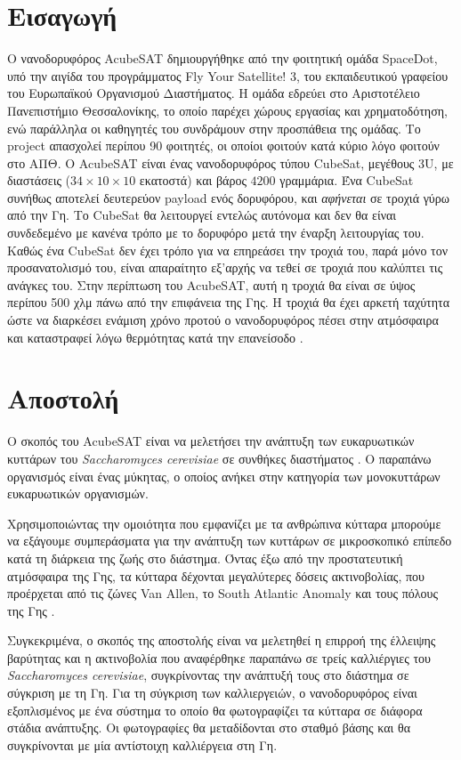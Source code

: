 \documentclass[a4paper,nobib,justified]{tufte-book}
\begin{document}
\section{Εισαγωγή}
Ο νανοδορυφόρος AcubeSAT δημιουργήθηκε από την φοιτητική ομάδα SpaceDot, υπό την αιγίδα του προγράμματος Fly Your Satellite! 3, του εκπαιδευτικού γραφείου του Ευρωπαϊκού Οργανισμού Διαστήματος. Η ομάδα εδρεύει στο Αριστοτέλειο Πανεπιστήμιο Θεσσαλονίκης, το οποίο παρέχει χώρους εργασίας και χρηματοδότηση, ενώ παράλληλα οι καθηγητές του συνδράμουν στην προσπάθεια της ομάδας. Το project απασχολεί περίπου 90 φοιτητές, οι οποίοι φοιτούν κατά κύριο λόγο φοιτούν στο ΑΠΘ. Ο AcubeSAT είναι ένας νανοδορυφόρος τύπου CubeSat, μεγέθους 3U, με διαστάσεις ($34 \times 10 \times 10$ εκατοστά) και βάρος $4200$ γραμμάρια. Ένα CubeSat συνήθως αποτελεί δευτερεύον payload ενός δορυφόρου, και \emph{αφήνεται} σε τροχιά γύρω από την Γη. Το CubeSat θα λειτουργεί εντελώς αυτόνομα και δεν θα είναι συνδεδεμένο με κανένα τρόπο με το δορυφόρο μετά την έναρξη λειτουργίας του. Καθώς ένα CubeSat δεν έχει τρόπο για να επηρεάσει την τροχιά του, παρά μόνο τον προσανατολισμό του, είναι απαραίτητο εξ'αρχής να τεθεί σε τροχιά που καλύπτει τις ανάγκες του. Στην περίπτωση του AcubeSAT, αυτή η τροχιά θα είναι σε ύψος περίπου 500 χλμ πάνω από την επιφάνεια της Γης. Η τροχιά θα έχει αρκετή ταχύτητα ώστε να διαρκέσει ενάμιση χρόνο προτού ο νανοδορυφόρος πέσει στην ατμόσφαιρα και καταστραφεί λόγω θερμότητας κατά την επανείσοδο .

\section{Αποστολή}
Ο σκοπός του AcubeSAT είναι να μελετήσει την ανάπτυξη των ευκαρυωτικών κυττάρων του \emph{Saccharomyces cerevisiae} σε συνθήκες διαστήματος . Ο παραπάνω οργανισμός είναι ένας μύκητας, ο οποίος ανήκει στην κατηγορία των μονοκυττάρων ευκαρυωτικών οργανισμών. 

Χρησιμοποιώντας την ομοιότητα που εμφανίζει με τα ανθρώπινα κύτταρα μπορούμε να εξάγουμε συμπεράσματα για την ανάπτυξη των κυττάρων σε μικροσκοπικό επίπεδο κατά τη διάρκεια της ζωής στο διάστημα. Όντας έξω από την προστατευτική ατμόσφαιρα της Γης, τα κύτταρα δέχονται μεγαλύτερες δόσεις ακτινοβολίας, που προέρχεται από τις ζώνες Van Allen, το South Atlantic Anomaly και τους πόλους της Γης . 

Συγκεκριμένα, ο σκοπός της αποστολής είναι να μελετηθεί η επιρροή της έλλειψης βαρύτητας και η ακτινοβολία που αναφέρθηκε παραπάνω σε τρείς καλλιέργιες του \emph{Saccharomyces cerevisiae}, συγκρίνοντας την ανάπτυξή τους στο διάστημα σε σύγκριση με τη Γη. Για τη σύγκριση των καλλιεργειών, ο νανοδορυφόρος είναι εξοπλισμένος με ένα σύστημα το οποίο θα φωτογραφίζει τα κύτταρα σε διάφορα στάδια ανάπτυξης. Οι φωτογραφίες θα μεταδίδονται στο σταθμό βάσης και θα συγκρίνονται με μία αντίστοιχη καλλιέργεια στη Γη.
\end{document}
